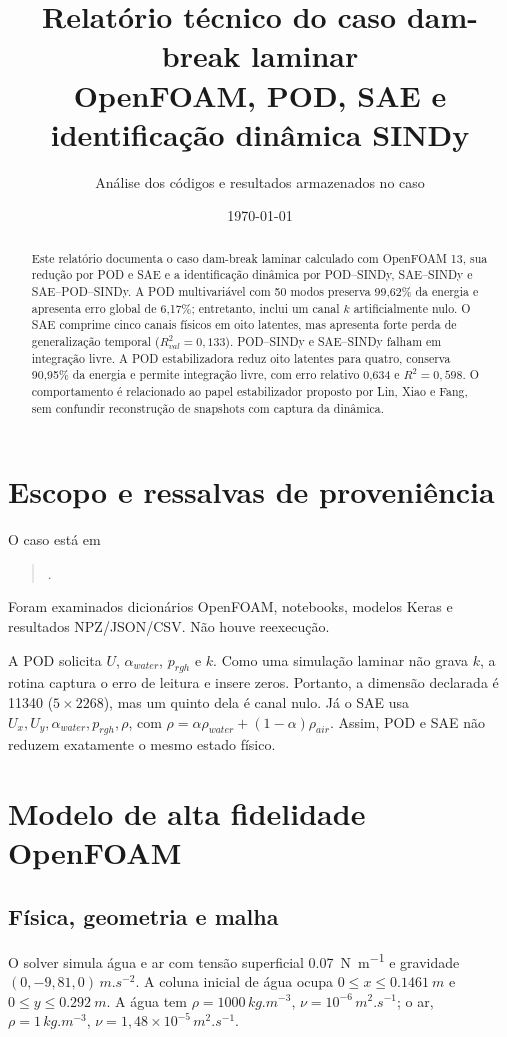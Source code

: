 \documentclass[12pt,a4paper]{article}
\title{\textbf{Relatório técnico do caso dam-break laminar}\\[0.4em]OpenFOAM, POD, SAE e identificação dinâmica SINDy}
\author{Análise dos códigos e resultados armazenados no caso}\date{\today}
\begin{document}
\maketitle
\begin{abstract}
Este relatório documenta o caso dam-break laminar calculado com OpenFOAM 13, sua redução por POD e SAE e a identificação dinâmica por POD--SINDy, SAE--SINDy e SAE--POD--SINDy. A POD multivariável com 50 modos preserva 99,62\% da energia e apresenta erro global de 6,17\%; entretanto, inclui um canal $k$ artificialmente nulo. O SAE comprime cinco canais físicos em oito latentes, mas apresenta forte perda de generalização temporal ($R^2_{val}=0,133$). POD--SINDy e SAE--SINDy falham em integração livre. A POD estabilizadora reduz oito latentes para quatro, conserva 90,95\% da energia e permite integração livre, com erro relativo 0,634 e $R^2=0,598$. O comportamento é relacionado ao papel estabilizador proposto por Lin, Xiao e Fang, sem confundir reconstrução de snapshots com captura da dinâmica.
\end{abstract}
\tableofcontents\listoffigures\listoftables\clearpage

\section{Escopo e ressalvas de proveniência}
O caso está em
\begin{quote}\small{}.\end{quote}
Foram examinados dicionários OpenFOAM, notebooks, modelos Keras e resultados NPZ/JSON/CSV. Não houve reexecução.

A POD solicita $U$, $\alpha_{water}$, $p_{rgh}$ e $k$. Como uma simulação laminar não grava $k$, a rotina captura o erro de leitura e insere zeros. Portanto, a dimensão declarada é 11340 ($5\times2268$), mas um quinto dela é canal nulo. Já o SAE usa $U_x,U_y,\alpha_{water},p_{rgh},\rho$, com $\rho=\alpha\rho_{water}+(1-\alpha)\rho_{air}$. Assim, POD e SAE não reduzem exatamente o mesmo estado físico.

\section{Modelo de alta fidelidade OpenFOAM}
\subsection{Física, geometria e malha}
O solver  simula água e ar com tensão superficial \SI{0.07}{N.m^{-1}} e gravidade $(0,-9{,}81,0)\,\si{m.s^{-2}}$. A coluna inicial de água ocupa $0\le x\le\SI{0.1461}{m}$ e $0\le y\le\SI{0.292}{m}$. A água tem $\rho=1000\,\si{kg.m^{-3}}$, $\nu=10^{-6}\,\si{m^2.s^{-1}}$; o ar, $\rho=1\,\si{kg.m^{-3}}$, $\nu=1{,}48\times10^{-5}\,\si{m^2.s^{-1}}$.
\end{document}
